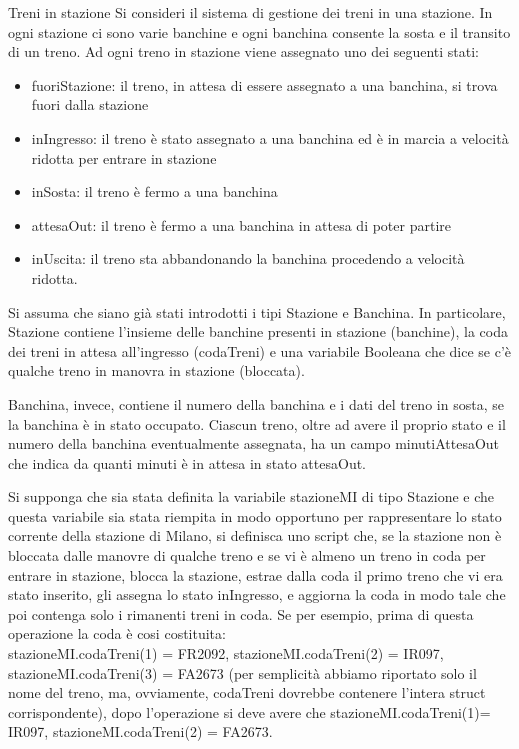 \documentclass[format=169, handout, 10pt]{beamer}
\begin{document}
\begin{frame}[allowframebreaks]{Treni in stazione}
Si consideri il sistema di gestione dei treni in una stazione. In ogni stazione ci sono varie banchine e
ogni banchina consente la sosta e il transito di un treno. Ad ogni treno in stazione viene assegnato uno dei
seguenti stati:
\begin{itemize}
\item fuoriStazione: il treno, in attesa di essere assegnato a una banchina, si trova fuori dalla stazione
\item inIngresso: il treno è stato assegnato a una banchina ed è in marcia a velocità ridotta per entrare in
stazione
\item inSosta: il treno è fermo a una banchina
\item attesaOut: il treno è fermo a una banchina in attesa di poter partire
\item  inUscita: il treno sta abbandonando la banchina procedendo a velocità ridotta.
\end{itemize}
Si assuma che siano già stati introdotti i tipi Stazione e Banchina. In particolare, Stazione contiene l'insieme delle banchine presenti in stazione (banchine), la coda dei treni in attesa all'ingresso (codaTreni) e una variabile Booleana che dice se c'è qualche treno in manovra in stazione (bloccata).

Banchina, invece, contiene il numero della banchina e i dati del
treno in sosta, se la banchina è in stato occupato. Ciascun treno, oltre ad avere il proprio stato e il numero della banchina eventualmente assegnata, ha un campo minutiAttesaOut che indica da quanti minuti è in
attesa in stato attesaOut.

Si supponga che sia stata definita la variabile stazioneMI di tipo Stazione e che questa variabile sia stata
riempita in modo opportuno per rappresentare lo stato corrente della stazione di Milano, si definisca uno script che, se la stazione non è bloccata dalle manovre di qualche
treno e se vi è almeno un treno in coda per entrare in stazione, blocca la stazione, estrae dalla coda il
primo treno che vi era stato inserito, gli assegna lo stato inIngresso, e aggiorna la coda in modo tale
che poi contenga solo i rimanenti treni in coda. Se per esempio, prima di questa operazione la coda è cosi costituita: \\
stazioneMI.codaTreni(1) = FR2092, stazioneMI.codaTreni(2) = IR097,
stazioneMI.codaTreni(3) = FA2673 (per semplicità abbiamo riportato solo il nome del treno, ma,
ovviamente, codaTreni dovrebbe contenere l’intera struct corrispondente), dopo l’operazione si deve
avere che stazioneMI.codaTreni(1)= IR097, stazioneMI.codaTreni(2) = FA2673.

\end{frame}
\end{document}
